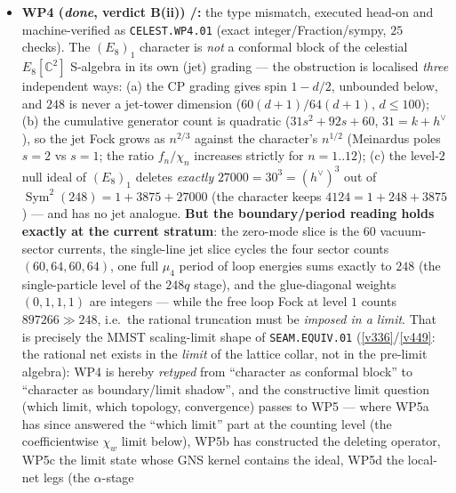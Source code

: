 \begin{itemize}
$\gcar{=}5\mid h^\vee$ ($1/8$); the conjunction that isolates $\mathfrak e_8$ is post hoc, not
preregistered. \emph{Alignment survives; selectivity does not} --- the $\cthree$-connection of the
celestial route is convention-level compatibility plus genuine $\lambda$-arithmetic, \emph{not}
$\mathfrak e_8$-selective evidence, and never a derivation of $\cthree$ from celestial data.
\item \textbf{WP4 (\emph{done}, verdict B(ii)) \mE/\mC:} the type mismatch, executed head-on and
machine-verified as \texttt{CELEST.WP4.01}  (exact
integer/Fraction/sympy, $25$ checks). The $(E_8)_1$ character is \emph{not} a conformal block of the
celestial $E_8[\mathbb C^2]$ S-algebra in its own (jet) grading --- the obstruction is localised
\emph{three} independent ways: (a) the CP grading gives spin $1-d/2$, unbounded below, and $248$ is never
a jet-tower dimension ($60(d{+}1)/64(d{+}1)$, $d\le100$); (b) the cumulative generator count is quadratic
($31s^2{+}92s{+}60$, $31=k{+}h^\vee$), so the jet Fock grows as $n^{2/3}$ against the character's
$n^{1/2}$ (Meinardus poles $s{=}2$ vs $s{=}1$; the ratio $f_n/\chi_n$ increases strictly for $n=1..12$);
(c) the level-$2$ null ideal of $(E_8)_1$ deletes \emph{exactly}
$27000=30^3=(h^\vee)^3$ out of $\operatorname{Sym}^2(248)=1{+}3875{+}27000$ (the character keeps
$4124=1{+}248{+}3875$) --- and has no jet analogue. \textbf{But the boundary/period reading holds exactly
at the current stratum}: the zero-mode slice is the $60$ vacuum-sector currents, the single-line jet slice
cycles the four sector counts $(60,64,60,64)$, one full $\mu_4$ period of loop energies sums exactly to
$248$ (the single-particle level of the $248q$ stage), and the glue-diagonal weights $(0,1,1,1)$ are
integers --- while the free loop Fock at level $1$ counts $897266\gg248$, i.e.\ the rational truncation
must be \emph{imposed in a limit}. That is precisely the MMST scaling-limit shape of
\texttt{SEAM.EQUIV.01} (\vref{v336}/\vref{v449}: the rational net exists in the \emph{limit} of the
lattice collar, not in the pre-limit algebra): WP4 is hereby \emph{retyped} from ``character as conformal
block'' to ``character as boundary/limit shadow'', and the constructive limit question (which limit, which
topology, convergence) passes to WP5 --- where WP5a has since answered the ``which limit'' part at the
counting level (the coefficientwise $\chi_w$ limit below), WP5b has constructed the deleting operator,
WP5c the limit state whose GNS kernel contains the ideal, WP5d the local-net legs (the $\alpha$-stage

\end{itemize}
